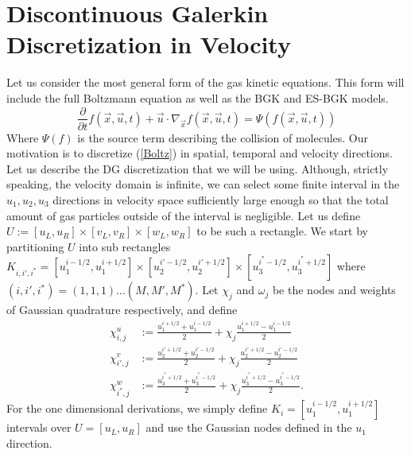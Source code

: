 \section{Discontinuous Galerkin Discretization in Velocity}
Let us consider the most general form of the gas kinetic equations. This form will include the full Boltzmann equation as well as the BGK and ES-BGK models.
%
\begin{equation}
\label{Boltz}
\frac{\partial}{\partial t} f(\vec{x},\vec{u},t) + \vec{u} \cdot \nabla_{\vec{x}} f(\vec{x},\vec{u},t) = \Psi (f(\vec{x},\vec{u},t))
\end{equation}
%
Where $\Psi (f)$ is the source term describing the collision of molecules. Our motivation is to discretize (\ref{Boltz}) in spatial, temporal and velocity directions. Let us describe the DG discretization that we will be using. Although, strictly speaking, the velocity domain is infinite, we can select some finite interval in the $u_1, u_2, u_3$ directions in velocity space sufficiently large enough so that the total amount of gas particles outside of the interval is negligible. Let us define $U := [u_L,u_R] \times [v_L,v_R] \times [w_L,w_R]$ to be such a rectangle. We start by partitioning $U$ into sub rectangles $K_{i,i',i^*} = [u_1^{i-1/2},u_1^{i+1/2}] \times [u_2^{i'-1/2},u_2^{i'+1/2}] \times [u_3^{i^*-1/2},u_3^{i^*+1/2}]$ where $(i,i',i^*) = (1,1,1) \ldots (M,M',M^*)$. Let $\chi_j$ and $\omega_j$ be the nodes and weights of Gaussian quadrature respectively, and define
%
\begin{align*}
\chi_{i,j}^u &:= \frac{u_1^{i+1/2} + u_1^{i-1/2}}{2} + \chi_j \frac{u_1^{i+1/2} - u_1^{i-1/2}}{2}\\
\chi_{i',j}^v &:= \frac{u_2^{i'+1/2} + u_2^{i'-1/2}}{2} + \chi_j \frac{u_2^{i'+1/2} - u_2^{i'-1/2}}{2}\\
\chi_{i^*,j}^w &:= \frac{u_3^{i^*+1/2} + u_3^{i^*-1/2}}{2} + \chi_j \frac{u_3^{i^*+1/2} - u_3^{i^*-1/2}}{2}.
\end{align*}
%
For the one dimensional derivations, we simply define $K_i = [u_1^{i-1/2}, u_1^{i+1/2}]$ intervals over $U = [u_L, u_R]$ and use the Gaussian nodes defined in the $u_1$ direction.
